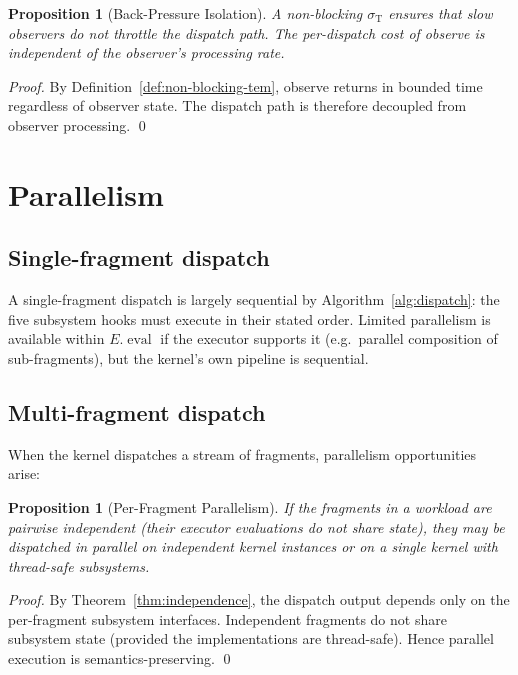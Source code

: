 \documentclass[twocolumn,11pt,a4paper]{article}
\newtheorem{proposition}[theorem]{Proposition}
\DeclareMathOperator{\eval}{eval}
\newcommand{\Sub}{\sigma}
\newcommand{\Exec}{E}
\newcommand{\Tem}{\Sub_{\mathrm{T}}}
\begin{document}
\begin{proposition}[Back-Pressure Isolation]
\label{prop:back-pressure}
A non-blocking $\Tem$ ensures that slow observers do not throttle the dispatch path. The per-dispatch cost of observe is independent of the observer's processing rate.
\end{proposition}

\begin{proof}
By Definition~\ref{def:non-blocking-tem}, observe returns in bounded time regardless of observer state. The dispatch path is therefore decoupled from observer processing. \qed
\end{proof}

\section{Parallelism}
\label{sec:parallelism}

\subsection{Single-fragment dispatch}

A single-fragment dispatch is largely sequential by Algorithm~\ref{alg:dispatch}: the five subsystem hooks must execute in their stated order. Limited parallelism is available within $\Exec.\eval$ if the executor supports it (e.g.\ parallel composition of sub-fragments), but the kernel's own pipeline is sequential.

\subsection{Multi-fragment dispatch}

When the kernel dispatches a stream of fragments, parallelism opportunities arise:

\begin{proposition}[Per-Fragment Parallelism]
\label{prop:per-fragment-parallel}
If the fragments in a workload are pairwise independent (their executor evaluations do not share state), they may be dispatched in parallel on independent kernel instances or on a single kernel with thread-safe subsystems.
\end{proposition}

\begin{proof}
By Theorem~\ref{thm:independence}, the dispatch output depends only on the per-fragment subsystem interfaces. Independent fragments do not share subsystem state (provided the implementations are thread-safe). Hence parallel execution is semantics-preserving. \qed
\end{proof}
\end{document}
